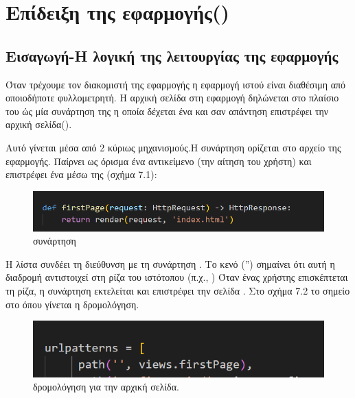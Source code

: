 \chapter{Επίδειξη της εφαρμογής()}

\section{Εισαγωγή-Η λογική της λειτουργίας της εφαρμογής }

Όταν τρέχουμε τον διακομιστή της εφαρμογής η εφαρμογή ιστού
είναι διαθέσιμη από οποιοδήποτε φυλλομετρητή. Η αρχική σελίδα στη εφαρμογή
 δηλώνεται στο πλαίσιο του  ώς μία συνάρτηση της 
η οποία δέχεται ένα  και σαν απάντηση επιστρέφει την αρχική σελίδα().

Αυτό γίνεται μέσα από 2 κύριως μηχανισμούς.Η συνάρτηση  ορίζεται στο αρχείο  της εφαρμογής. Παίρνει ως όρισμα ένα αντικείμενο  
(την αίτηση του χρήστη) και επιστρέφει ένα  μέσω της (σχήμα 7.1):

\FloatBarrier
\begin{figure}[h]
	\centering
	\includegraphics[width=1.0\textwidth]{graphics/firstPage.png}
	\caption{  συνάρτηση}
\end{figure}

\FloatBarrier

Η λίστα  συνδέει τη διεύθυνση  
με τη συνάρτηση . Το κενό  ('') σημαίνει ότι αυτή η διαδρομή αντιστοιχεί στη ρίζα του ιστότοπου (π.χ., )
Όταν ένας χρήστης επισκέπτεται τη ρίζα, η συνάρτηση  
εκτελείται και επιστρέφει την  σελίδα . Στο σχήμα 7.2 το σημείο στο  όπου γίνεται η δρομολόγηση.

\FloatBarrier

\begin{figure}[h]
	\centering
	\includegraphics[width=1.0\textwidth]{graphics/urls_firstPage.png}
	\caption{  δρομολόγηση για την αρχική σελίδα.}
\end{figure}

